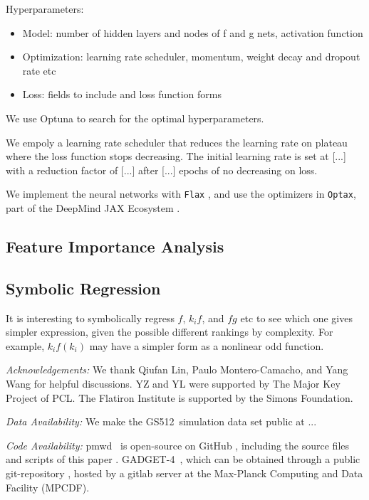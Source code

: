 \documentclass[modern, trackchanges, dvipsnames]{aastex631}
\newcommand{\pmwd}{{\usefont{T1}{nova}{m}{sl}pmwd}}
\newcommand{\GADGET}{{{\fontsize{10pt}{12pt}\selectfont GADGET}-4}}
\newcommand{\GSDATA}{{GS512}}
\newcommand{\YL}[1]{\textcolor{Bittersweet}{#1}}
\begin{document}
Hyperparameters:
\begin{itemize}
  \item Model: number of hidden layers and nodes of f and g nets, activation function
  \item Optimization: learning rate scheduler, momentum, weight decay and dropout rate etc
  \item Loss: fields to include and loss function forms
\end{itemize}

We use Optuna \citep{optuna_2019} to search for the optimal hyperparameters.

We empoly a learning rate scheduler that reduces the learning rate on plateau
where the loss function stops decreasing.
The initial learning rate is set at [...] with a reduction factor of [...] after
[...] epochs of no decreasing on loss.


We implement the neural networks with \texttt{Flax} \citep{flax2020github}, and
use the optimizers in \texttt{Optax}, part of the DeepMind JAX Ecosystem
\citep{deepmind2020jax}.


\vspace{1em}
\subsection{Feature Importance Analysis}



\vspace{1em}
\subsection{Symbolic Regression}


\YL{It is interesting to symbolically regress $f$, $k_i f$, and $f g$
etc to see which one gives simpler expression, given the possible
different rankings by complexity.
For example, $k_i f(k_i)$ may have a simpler form as a nonlinear odd
function.}


\vspace{1em}
\textit{\large Acknowledgements:}
We thank Qiufan Lin, Paulo Montero-Camacho, and Yang Wang for helpful
discussions.
YZ and YL were supported by The Major Key Project of PCL.
The Flatiron Institute is supported by the Simons Foundation.


\vspace{1em}
\textit{\large Data Availability:}
We make the \GSDATA\ simulation data set public at ...


\vspace{1em}
\textit{\large Code Availability:}
\pmwd\ \citep{Li2022b} is open-source on GitHub
\href{https://github.com/eelregit/pmwd}{\faGithub}, including the source files
and scripts of this paper
\href{https://github.com/eelregit/pmwd/tree/master/docs/papers/sto}{\faFile}.
\GADGET\ \citep{GADGET-4}, which can be obtained through a public git-repository
\href{http://gitlab.mpcdf.mpg.de/vrs/gadget4}{\faGitlab}, hosted by a gitlab
server at the Max-Planck Computing and Data Facility (MPCDF).
\end{document}
